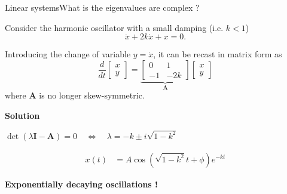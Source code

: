 \documentclass[usenames,dvipsnames,svgnames,10pt,aspectratio=169]{beamer}
\begin{document}
\begin{frame}[t, c]{Linear systems}{What is the eigenvalues are complex ?}
  \begin{minipage}{.48\textwidth}
    Consider the harmonic oscillator with a small damping (i.e. $k < 1$)
    \[
    \ddot{x} + 2k\dot{x} + x = 0.
    \]

    Introducing the change of variable $y = \dot{x}$, it can be recast in matrix form as
    \[
    \dfrac{d}{dt} \begin{bmatrix} x \\ y \end{bmatrix}
    =
    \underbrace{
      \begin{bmatrix}
        0 & 1 \\
        -1 & -2k
      \end{bmatrix}
    }_{\bm{A}}
    \begin{bmatrix} x \\ y \end{bmatrix}
    \]
    where $\bm{A}$ is no longer skew-symmetric.

  \end{minipage}%
  \hfill
  \begin{minipage}{.48\textwidth}
    \centering
    \textbf{Solution}
    
    \medskip
    
    \( \det(\lambda \bm{I} - \bm{A}) = 0 \quad \Leftrightarrow \quad \lambda = -k \pm i \sqrt{1 - k^2} \)
    
    \bigskip
    
    \[
    \begin{aligned}
      x(t) & = A \cos(\sqrt{1 - k^2} t + \phi) e^{-kt}
    \end{aligned}
    \]
    
    \bigskip
    
    \begin{block}{}
      \centering
      \textbf{Exponentially decaying oscillations !}
    \end{block}
    
  \end{minipage}

  \vspace{1cm}
\end{frame}
\end{document}
